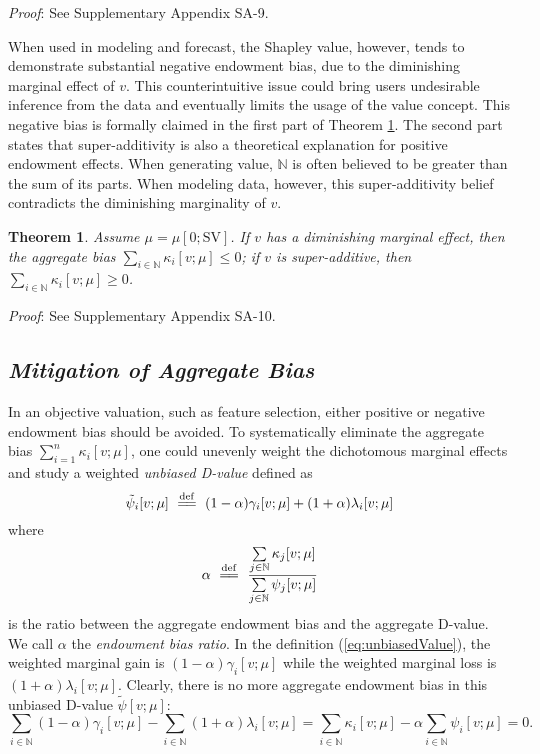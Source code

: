\documentclass[a4paper,12pt]{article}
\newtheorem{theorem}{Theorem}
\newcommand{\eqdef}{\overset{\mathrm{def}}{=\joinrel=}}
\begin{document}
\noindent \textit{Proof}: See Supplementary Appendix SA-9.

When used in modeling and forecast, the Shapley value, 
however, tends to demonstrate substantial negative endowment bias, due to the diminishing marginal effect of $v$. 
This counterintuitive issue could bring users undesirable inference from the data and eventually limits the usage of the value concept. 
This negative bias is formally claimed in the first part of Theorem \ref{thm:diminishing}. 
The second part states that super-additivity is also a theoretical explanation for positive endowment effects.
When generating value, $\mathbb{N}$ is often believed to be greater than the sum of its parts.
When modeling data, however, this super-additivity belief contradicts the diminishing marginality of $v$.

\begin{theorem}\label{thm:diminishing}
Assume $\mu = \mu[0; \mathrm{SV}]$. 
If $v$ has a diminishing marginal effect, then the aggregate bias $\sum\limits_{i\in \mathbb{N}} \kappa_i[v;\mu]\le 0$;
if $v$ is super-additive, then $\sum\limits_{i\in \mathbb{N}} \kappa_i[v;\mu]\ge 0$.
\end{theorem}

\noindent \textit{Proof}: See Supplementary Appendix SA-10.


\subsection{\textit{Mitigation of Aggregate Bias}}
\noindent In an objective valuation, such as feature selection, either positive or negative endowment bias should be avoided. 
To systematically eliminate the aggregate bias $\sum\limits_{i=1}^n \kappa_i[v;\mu]$, one could unevenly weight the dichotomous marginal effects and
study a weighted \textit{unbiased D-value} defined as
\begin{equation} \label{eq:unbiasedValue}
\tilde \psi_i[v;\mu] \
\eqdef \ (1-\alpha) \gamma_i[v;\mu] + (1+\alpha) \lambda_i[v;\mu]
\end{equation}
where 
\begin{equation} \label{eq:def_alpha}
\alpha \ \eqdef \ \frac{\sum\limits_{j \in \mathbb{N}} \kappa_j[v;\mu]}{\sum\limits_{j \in \mathbb{N}} \psi_j[v;\mu]}
\end{equation}
is the ratio between the aggregate endowment bias and the aggregate D-value. 
We call $\alpha$ the \textit{endowment bias ratio}.
In the definition (\ref{eq:unbiasedValue}), the weighted marginal gain is $(1-\alpha) \gamma_i[v;\mu] $ while the weighted marginal loss is $ (1+\alpha) \lambda_i[v;\mu]$. 
Clearly, there is no more aggregate endowment bias in this unbiased D-value $\tilde \psi [v;\mu]$:
$$
\sum\limits_{i\in \mathbb{N}} (1-\alpha) \gamma_i[v;\mu] - \sum\limits_{i\in \mathbb{N}} (1+\alpha) \lambda_i[v;\mu] 
=
\sum\limits_{i\in \mathbb{N}} \kappa_i[v;\mu] - \alpha \sum\limits_{i\in \mathbb{N}} \psi_i[v;\mu]
=
0.
$$
\end{document}
